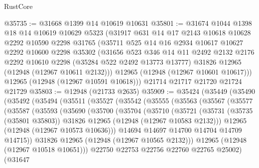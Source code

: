 \begin{lexlean}{RustCore}
\begin{coremodule}
@35735 := @31668 @1399 @14 @10619 @10631
@35801 := @31674
    @1044
    @1398
    @18
    @14
    @10619
    @10629
    @5323
    (@31917
      @631
      @14
      @17
      @2143
      @10618
      @10628
      @2292
      @10590
      @2298
      @31765
      (@35711
        @525
        @14
        @16
        @2934
        @10617
        @10627
        @2292
        @10600
        @2298
        @35302
        (@31656
          @523
          @346
          @14
          @11
          @2492
          @2132
          @2176
          @2292
          @10610
          @2298
          (@35284 @522 @2492 @13773 @13777)
          @31826
          @12965
          (@12948 (@12967 @10611 @2132)))
        @12965
        (@12948 (@12967 @10601 @10617)))
      @12965
      (@12948 (@12967 @10591 @10618)))
    @21714
    @21717
    @21720
    @21724
    @21729
@35803 := @12948 (@21733 @2635)
@35909 := @35424
    (@35449
      (@35490
        (@35492
          (@35494
            (@35511
              (@35527
                (@35542
                  (@35555
                    (@35563
                      (@35567
                        (@35577
                          (@35587
                            (@35593
                              (@35690
                                (@35700
                                  (@35704
                                    (@35710
                                      (@35721
                                        (@35731
                                          (@35735 (@35801 @35803))
                                          @31826
                                          @12965
                                          (@12948 (@12967 @10583 @2132)))
                                        @12965
                                        (@12948 (@12967 @10573 @10636)))
                                      @14694
                                      @14697
                                      @14700
                                      @14704
                                      @14709
                                      @14715))
                                  @31826
                                  @12965
                                  (@12948 (@12967 @10565 @2132)))
                                @12965
                                (@12948 (@12967 @10518 @10651)))
                              @22750
                              @22753
                              @22756
                              @22760
                              @22765
                              @25002)
                            (@31647

\end{coremodule}
\end{lexlean}
